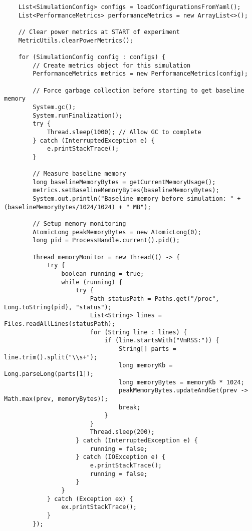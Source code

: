 \begin{verbatim}
    List<SimulationConfig> configs = loadConfigurationsFromYaml();
    List<PerformanceMetrics> performanceMetrics = new ArrayList<>();
    
    // Clear power metrics at START of experiment
    MetricUtils.clearPowerMetrics();
    
    for (SimulationConfig config : configs) {
        // Create metrics object for this simulation
        PerformanceMetrics metrics = new PerformanceMetrics(config);
        
        // Force garbage collection before starting to get baseline memory
        System.gc();
        System.runFinalization();
        try {
            Thread.sleep(1000); // Allow GC to complete
        } catch (InterruptedException e) {
            e.printStackTrace();
        }
        
        // Measure baseline memory
        long baselineMemoryBytes = getCurrentMemoryUsage();
        metrics.setBaselineMemoryBytes(baselineMemoryBytes);
        System.out.println("Baseline memory before simulation: " + (baselineMemoryBytes/1024/1024) + " MB");
        
        // Setup memory monitoring
        AtomicLong peakMemoryBytes = new AtomicLong(0);
        long pid = ProcessHandle.current().pid();
        
        Thread memoryMonitor = new Thread(() -> {
            try {
                boolean running = true;
                while (running) {
                    try {
                        Path statusPath = Paths.get("/proc", Long.toString(pid), "status");
                        List<String> lines = Files.readAllLines(statusPath);
                        for (String line : lines) {
                            if (line.startsWith("VmRSS:")) {
                                String[] parts = line.trim().split("\\s+");
                                long memoryKb = Long.parseLong(parts[1]);
                                long memoryBytes = memoryKb * 1024;
                                peakMemoryBytes.updateAndGet(prev -> Math.max(prev, memoryBytes));
                                break;
                            }
                        }
                        Thread.sleep(200);
                    } catch (InterruptedException e) {
                        running = false;
                    } catch (IOException e) {
                        e.printStackTrace();
                        running = false;
                    }
                }
            } catch (Exception ex) {
                ex.printStackTrace();
            }
        });
        

\end{verbatim}
